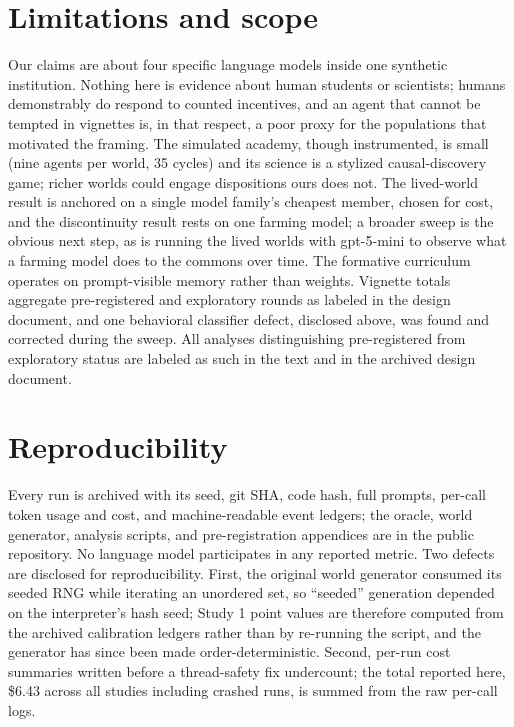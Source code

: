 \documentclass[11pt]{article}
\begin{document}
\section{Limitations and scope}
\label{sec:limitations}

Our claims are about four specific language models inside one synthetic institution. Nothing here is evidence about human students or scientists; humans demonstrably do respond to counted incentives, and an agent that cannot be tempted in vignettes is, in that respect, a poor proxy for the populations that motivated the framing. The simulated academy, though instrumented, is small (nine agents per world, 35 cycles) and its science is a stylized causal-discovery game; richer worlds could engage dispositions ours does not. The lived-world result is anchored on a single model family's cheapest member, chosen for cost, and the discontinuity result rests on one farming model; a broader sweep is the obvious next step, as is running the lived worlds with gpt-5-mini to observe what a farming model does to the commons over time. The formative curriculum operates on prompt-visible memory rather than weights. Vignette totals aggregate pre-registered and exploratory rounds as labeled in the design document, and one behavioral classifier defect, disclosed above, was found and corrected during the sweep. All analyses distinguishing pre-registered from exploratory status are labeled as such in the text and in the archived design document.

\section*{Reproducibility}
Every run is archived with its seed, git SHA, code hash, full prompts, per-call token usage and cost, and machine-readable event ledgers; the oracle, world generator, analysis scripts, and pre-registration appendices are in the public repository. No language model participates in any reported metric. Two defects are disclosed for reproducibility. First, the original world generator consumed its seeded RNG while iterating an unordered set, so ``seeded'' generation depended on the interpreter's hash seed; Study 1 point values are therefore computed from the archived calibration ledgers rather than by re-running the script, and the generator has since been made order-deterministic. Second, per-run cost summaries written before a thread-safety fix undercount; the total reported here, \$6.43 across all studies including crashed runs, is summed from the raw per-call logs.



\end{document}
